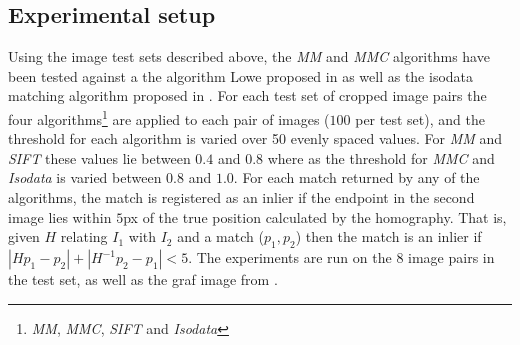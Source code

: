 \documentclass[12pt,journal,compsoc]{IEEEtran}
\begin{document}
\subsection{Experimental setup}
%
Using the image test sets described above, the \emph{MM} and \emph{MMC} 
algorithms have been tested against a the algorithm Lowe proposed in 
\cite{lowe2004sift} as well as the isodata matching algorithm proposed 
in \cite{das2008event}. For each test set of cropped image pairs the 
four algorithms\footnote{\emph{MM}, \emph{MMC}, \emph{SIFT} and 
\emph{Isodata}} are applied to each pair of images ($100$ per test set), 
and the threshold for each algorithm is varied over 50 evenly spaced 
values.  For \emph{MM} and \emph{SIFT} these values lie between $0.4$ 
and $0.8$ where as the threshold for \emph{MMC} and \emph{Isodata} is 
varied between $0.8$ and $1.0$.  For each match returned by any of the 
algorithms, the match is registered as an inlier if the endpoint in the 
second image lies within $5$px of the true position calculated by the 
homography.  That is, given $H$ relating $I_1$ with $I_2$ and a match 
($p_1, p_2$) then the match is an inlier if $\left\vert Hp_1 - p_2 
\right\vert + \left\vert H^{-1}p_2 - p_1 \right\vert < 5$. The 
experiments are run on the $8$ image pairs in the test set, as well as 
the graf image from \cite{mikolajczyk2005performance}.
%
\end{document}
